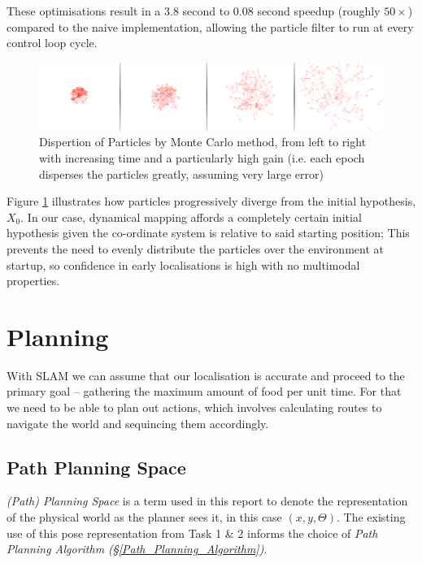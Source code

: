\documentclass[11pt, a4paper]{article}
\begin{document}
These optimisations result in a 3.8 second to 0.08 second speedup (roughly $50\times$) compared to
the naive implementation, allowing the particle filter to run at every control loop cycle.

\begin{figure}[h]
  \includegraphics[width=\textwidth]{../assets/particle-disperse-random.png}
  \caption{
    \label{fig:particle-disperse}
    Dispertion of Particles by Monte Carlo method, from left to right with increasing time and 
    a particularly high gain (i.e. each epoch disperses the particles greatly, assuming very large error)
  }
\end{figure}

Figure \ref{fig:particle-disperse} illustrates how particles progressively diverge from the initial 
hypothesis, ${X_0}$. In our case, dynamical mapping affords a completely certain initial hypothesis
given the co-ordinate system is relative to said starting position; This prevents the need to
evenly distribute the particles over the environment at startup, so confidence in early localisations
is high with no multimodal properties.




\section{Planning}

With SLAM we can assume that our localisation is accurate and proceed to the primary goal -- gathering 
the maximum amount of food per unit time. For that we need to be able to plan out actions, which involves 
calculating routes to navigate the world and sequincing them accordingly.

\subsection{Path Planning Space}
\label{Path_Planning_Space}

\textit{(Path) Planning Space} is a term used  in this report to denote the representation of the 
physical world as the planner sees it, in this case $(x, y, \Theta)$. The existing use of this
pose representation from Task 1 \& 2 informs the choice of \textit{Path Planning Algorithm 
(\S\ref{Path_Planning_Algorithm})}. 
\end{document}
